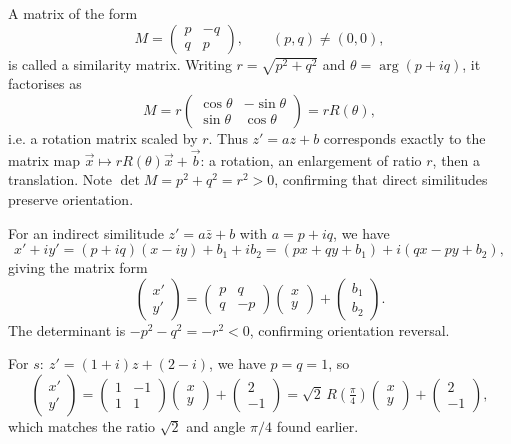 \documentclass[11pt]{article}
\newcommand{\cle}[1]{{\popxbold\color{popdark}#1}}
\begin{document}
\begin{propriete}
A matrix of the form
\[ M = \begin{pmatrix} p & -q \\ q & p \end{pmatrix}, \qquad (p,q) \neq (0,0), \]
is called a \cle{similarity matrix}. Writing $r = \sqrt{p^2+q^2}$ and $\theta = \arg(p+iq)$, it factorises as
\[ M = r\begin{pmatrix} \cos\theta & -\sin\theta \\ \sin\theta & \cos\theta \end{pmatrix} = rR(\theta), \]
i.e. a rotation matrix scaled by $r$. Thus $z' = az + b$ corresponds exactly to the matrix map $\vec{x} \mapsto rR(\theta)\vec{x} + \vec{b}$: a rotation, an enlargement of ratio $r$, then a translation. Note $\det M = p^2 + q^2 = r^2 > 0$, confirming that direct similitudes preserve orientation.

For an indirect similitude $z' = a\bar{z} + b$ with $a = p+iq$, we have
\[ x' + iy' = (p+iq)(x-iy) + b_1 + ib_2 = (px + qy + b_1) + i(qx - py + b_2), \]
giving the matrix form
\[ \begin{pmatrix} x' \\ y' \end{pmatrix} = \begin{pmatrix} p & q \\ q & -p \end{pmatrix} \begin{pmatrix} x \\ y \end{pmatrix} + \begin{pmatrix} b_1 \\ b_2 \end{pmatrix}. \]
The determinant is $-p^2 - q^2 = -r^2 < 0$, confirming orientation reversal.
\end{propriete}

\begin{exemplebox}
For $s:\ z' = (1+i)z + (2-i)$, we have $p = q = 1$, so
\[ \begin{pmatrix} x' \\ y' \end{pmatrix} = \begin{pmatrix} 1 & -1 \\ 1 & 1 \end{pmatrix}\begin{pmatrix} x \\ y \end{pmatrix} + \begin{pmatrix} 2 \\ -1 \end{pmatrix} = \sqrt{2}\,R\!\left(\tfrac{\pi}{4}\right)\begin{pmatrix} x \\ y \end{pmatrix} + \begin{pmatrix} 2 \\ -1 \end{pmatrix}, \]
which matches the ratio $\sqrt{2}$ and angle $\pi/4$ found earlier.
\end{exemplebox}
\end{document}
